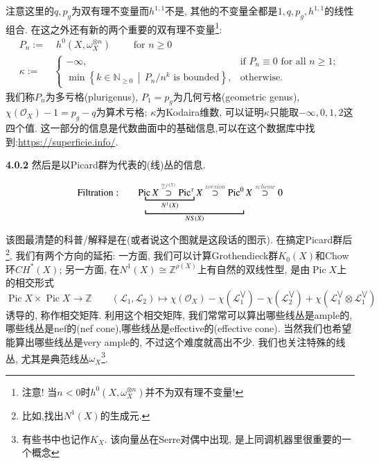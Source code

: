 \documentclass[UTF8,12pt,twoside]{article}
\theoremstyle{definition}
\newcommand{\ZZ}{\mathbb{Z}}  %
\newcommand{\NN}{\mathbb{N}}  %
\newcommand{\Pic}{\operatorname{Pic}}
\numberwithin{equation}{section}
\begin{document}
注意这里的$q,p_g$为双有理不变量而$h^{1,1}$不是, 其他的不变量全都是$1,q,p_g,h^{1,1}$的线性组合. 在这之外还有新的两个重要的双有理不变量\footnote{注意! 当$n<0$时$h^0(X,\omega_X^{\otimes n})$并不为双有理不变量!}: 
\begin{equation*}
\begin{aligned}
P_n:=&\;h^0(X,\omega_X^{\otimes n}) \qquad \text{ for } n \geqslant 0\\
\kappa:=& \begin{cases}
-\infty, & \text{if }P_n \equiv 0 \text{ for all } n \geqslant 1;\\
\min \left\{ k \in \NN_{\geqslant 0} \,\middle|\, P_n/n^k \text{ is bounded} \right\},& \text{otherwise.}
\end{cases}
\end{aligned}
\end{equation*}
我们称$P_n$为多亏格(plurigenus), $P_1=p_g$为几何亏格(geometric genus), $\chi(\mathcal{O}_X)-1=p_g-q$为算术亏格; $ \kappa$为Kodaira维数, 可以证明$\kappa$只能取$-\infty,0,1,2$这四个值. 这一部分的信息是代数曲面中的基础信息,可以在这个数据库中找到:\url{https://superficie.info/}.

\textbf{4.0.2} 然后是以Picard群为代表的(线)丛的信息.

$$\mathrm{Filtration: }\qquad
\mathrm{P}\underbracket{\underbracket{\!\mathrm{ic}^{\!\!\phantom{0}}  X\overset{\textcolor[RGB]{102,102,102}{\mathbb{Z}^{\,\rho (X)}}}{\supset }\mathrm{Pic}^{\tau}}_{N^1(X)}X
	\overset{\textcolor[RGB]{102,102,102}{torsion}}{\supset}\mathrm{Pic}^0}_{NS(X)}X\overset{\textcolor[RGB]{102,102,102}{scheme}}{\supset}0
$$


该图最清楚的科普/解释是在\cite[18.4.10]{vakil2017rising}(或者说这个图就是这段话的图示). 在搞定Picard群后\footnote{比如,找出$N^1(X)$的生成元.}, 我们有两个方向的延拓: 一方面, 我们可以计算Grothendieck群$K_0(X)$和Chow环$CH^*(X)$; 另一方面, 在$N^1(X)\cong \ZZ^{\rho(X)}$上有自然的双线性型, 是由$\Pic X$上的相交形式
$$\Pic X \times \Pic X \longrightarrow \ZZ \qquad (\mathcal{L}_1,\mathcal{L}_2) \longmapsto \chi(\mathcal{O}_X)-\chi(\mathcal{L}_1^{\bigvee})-\chi(\mathcal{L}_2^{\bigvee})+\chi(\mathcal{L}_1^{\bigvee} \otimes \mathcal{L}_1^{\bigvee})$$
诱导的, 称作相交矩阵. 利用这个相交矩阵, 我们常常可以算出哪些线丛是ample的,哪些线丛是nef的(nef cone),哪些线丛是effective的(effective cone). 当然我们也希望能算出哪些线丛是very ample的, 不过这个难度就高出不少. 我们也关注特殊的线丛, 尤其是典范线丛$\omega_X$\footnote{有些书中也记作$K_X$. 该向量丛在Serre对偶中出现, 是上同调机器里很重要的一个概念}.
\end{document}
